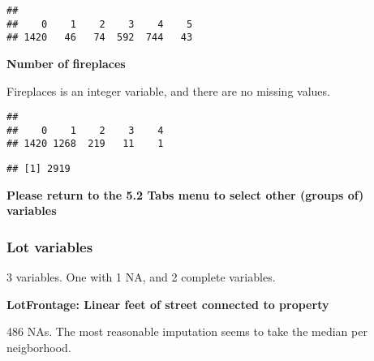\documentclass[]{article}
\newenvironment{Shaded}{\begin{snugshade}}{\end{snugshade}}
\newcommand{\KeywordTok}[1]{\textcolor[rgb]{0.13,0.29,0.53}{\textbf{#1}}}
\newcommand{\DataTypeTok}[1]{\textcolor[rgb]{0.13,0.29,0.53}{#1}}
\newcommand{\DecValTok}[1]{\textcolor[rgb]{0.00,0.00,0.81}{#1}}
\newcommand{\StringTok}[1]{\textcolor[rgb]{0.31,0.60,0.02}{#1}}
\newcommand{\OperatorTok}[1]{\textcolor[rgb]{0.81,0.36,0.00}{\textbf{#1}}}
\newcommand{\NormalTok}[1]{#1}
\begin{document}
\begin{verbatim}
## 
##    0    1    2    3    4    5 
## 1420   46   74  592  744   43
\end{verbatim}

\textbf{Number of fireplaces}

Fireplaces is an integer variable, and there are no missing values.

\begin{Shaded}
\end{Shaded}

\begin{verbatim}
## 
##    0    1    2    3    4 
## 1420 1268  219   11    1
\end{verbatim}

\begin{Shaded}
\end{Shaded}

\begin{verbatim}
## [1] 2919
\end{verbatim}

\textbf{Please return to the 5.2 Tabs menu to select other (groups of)
variables}

\subsubsection{Lot variables}\label{lot-variables}

3 variables. One with 1 NA, and 2 complete variables.

\textbf{LotFrontage: Linear feet of street connected to property}

486 NAs. The most reasonable imputation seems to take the median per
neigborhood.

\begin{Shaded}
\end{Shaded}
\end{document}

